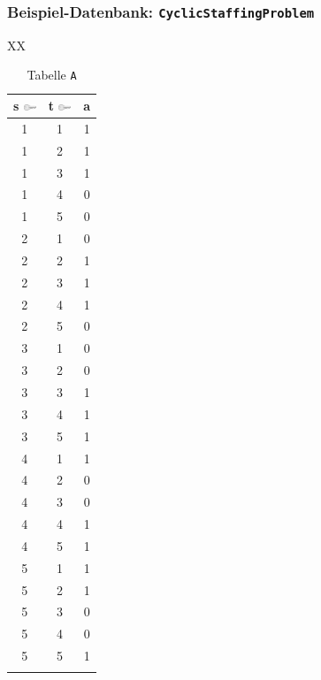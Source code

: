\begin{frame}
 \frametitle{Beispiel-Datenbank: \texttt{CyclicStaffingProblem}}
 \begin{table}[htbp]\tiny
 \begin{tabularx}{\linewidth}{XX}
  \begin{minipage}{\linewidth}
   \begin{subtable}[b]{\linewidth}
     \centering
     \begin{tabular}{ccc}
      \toprule
      \ttfamily s \includegraphics[width=1em]{Bilder/Key} & \ttfamily t \includegraphics[width=1em]{Bilder/Key} & \ttfamily a \\
      \midrule
      \arrayrulecolor{gray!30}
      1 & 1 & 1 \\
      1 & 2 & 1 \\
      1 & 3 & 1 \\
      1 & 4 & 0 \\
      1 & 5 & 0 \\
      \midrule
      2 & 1 & 0 \\
      2 & 2 & 1 \\
      2 & 3 & 1 \\
      2 & 4 & 1 \\
      2 & 5 & 0 \\
      \midrule
      3 & 1 & 0 \\
      3 & 2 & 0 \\
      3 & 3 & 1 \\
      3 & 4 & 1 \\
      3 & 5 & 1 \\
      \midrule
      4 & 1 & 1 \\
      4 & 2 & 0 \\
      4 & 3 & 0 \\
      4 & 4 & 1 \\
      4 & 5 & 1 \\
      \midrule
      5 & 1 & 1 \\
      5 & 2 & 1 \\
      5 & 3 & 0 \\
      5 & 4 & 0 \\
      5 & 5 & 1 \\
      \arrayrulecolor{black}
      \bottomrule
     \end{tabular}
    \caption{Tabelle \texttt{A}}

\end{subtable}
\end{minipage}
\end{tabularx}
\end{table}
\end{frame}

